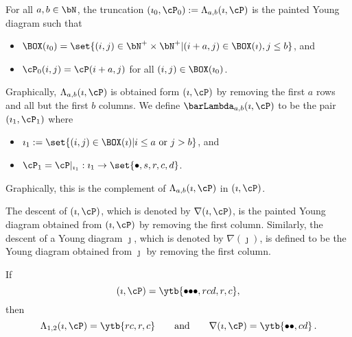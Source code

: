 \documentclass[ssunip]{subfiles}
\begin{document}
\begin{defn}
For all $a,b\in\bN$, the truncation 
$(\imath_0, \cP_0):=\Lambda_{a,b}(\imath,\cP)$ is the painted Young diagram such that 
\begin{itemize}
    \item $\BOX(\imath_0) = \set{(i,j)\in \bN^+\times \bN^+| (i+a,j)\in \BOX(\imath), j\leq b}$, and
    \item $\cP_0(i,j) = \cP(i+a,j)$ for all $(i,j)\in \BOX(\imath_0)$.
\end{itemize}
\end{defn}
Graphically,  $\Lambda_{a,b}(\imath,\cP)$ is obtained form $(\imath,\cP)$ by removing the first $a$ rows and  all but the first $b$ columns. 
We define $\barLambda_{a,b}(\imath,\cP)$ to be the pair $(\imath_1,\cP_1)$ where 
\begin{itemize}
\item $\imath_1 := \set{(i,j)\in \BOX(\imath)| i\leq a \text{ or } j>b }$, and
\item $\cP_1 = \cP|_{\imath_1}: \imath_1\rightarrow \set{\bullet,s,r,c,d}$. 
\end{itemize}
Graphically, this is the complement of $\Lambda_{a,b}(\imath,\cP)$ in $(\imath, \cP)$.

\begin{defn}
The descent of $(\imath, \cP)$, which is denoted by $\nabla(\imath, \cP)$, is the painted Young diagram obtained from $(\imath, \cP)$ by removing the first column. Similarly, the descent of a Young diagram $\jmath$, which is denoted by $\nabla(\jmath)$, is defined to be the Young diagram obtained from $\jmath$ by removing the first column.
 \end{defn}
\begin{Example}
If 
\[
 (\imath, \cP)= \ytb{{\bullet}{\bullet}{\bullet},{r}{c}{d},{r},{c} },
\]
then 
\[
  \Lambda_{1,2}(\imath, \cP)= \ytb{{r}{c},{r},{c} }\qquad\textrm{and}\qquad \nabla(\imath, \cP)=
  \ytb{{\bullet}{\bullet},{c}{d} }\, .
\]
  \end{Example}
  
\end{document}
